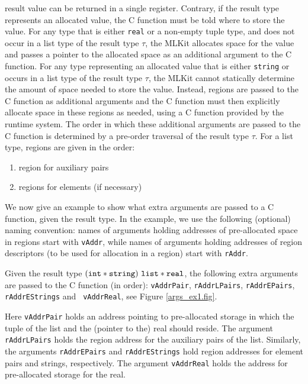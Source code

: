 \documentclass[12pt]{book}
\begin{document}
result value can be returned in a single register. Contrary, if the result type represents an allocated
value, the C function must be told where to store the value. For
any type that is either {\tt real} or a non-empty tuple type, and
does not occur in a list type of the result type $\tau$, the MLKit
allocates space for the value and passes a pointer to the allocated
space as an additional argument to the C function. For any type
representing an allocated value that is either {\tt string} or occurs in a
list type of the result type $\tau$, the MLKit cannot statically
determine the amount of space needed to store the value. Instead,
regions are passed to the C function as additional arguments and the C
function must then explicitly allocate space in these regions as
needed, using a C function provided by the runtime system. The order
in which these additional arguments are passed to the C function is determined
by a pre-order traversal of the result type $\tau$.  For a list type,
regions are given in the order:
\begin{enumerate}
    \item region for auxiliary pairs
    \item regions for elements (if necessary)
\end{enumerate}

We now give an example to show what extra arguments are passed to a
C function, given the result type. In the example, we use the following
(optional) naming convention:
names of arguments holding addresses of
pre-allocated space in regions
start with {\tt vAddr}, while names of arguments
holding addresses of region descriptors (to be used for allocation in a
region) start with {\tt rAddr}.
\begin{example}
  Given the result type $({\tt int} \ast {\tt string}) ~{\tt list}
  \ast {\tt real}$, the following extra ar\-gu\-ments are passed to the
  C function (in order): {\tt vAddrPair},
  {\tt rAddrLPairs}, {\tt rAddrEPairs}, {\tt rAddrEStrings} and {\tt
    vAddrReal}, see Figure \ref{args_ex1.fig}.

  Here {\tt vAddrPair} holds an address pointing to pre-allocated
  storage in which the tuple of the list and the (pointer to the) real
  should reside. The argument {\tt rAddrLPairs} holds the region
  address for the auxiliary pairs of the list. Similarly, the
  arguments {\tt rAddrEPairs} and {\tt rAddrEStrings} hold region
  addresses for element pairs and strings, respectively. The argument
  {\tt vAddrReal} holds the address for pre-allocated storage for the
  real.
\end{example}
\end{document}
